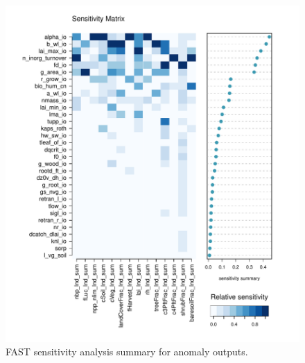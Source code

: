 \documentclass[gmd, manuscript]{copernicus}
\begin{document}
\begin{figure}[t]
\includegraphics[width=12cm]{./graphics/FAST_sensmat_YAnom_level1a_wave01.pdf}
\caption{FAST sensitivity analysis summary for anomaly outputs.}
\label{fig:FAST_sensmat_YAnom_level1a}
\end{figure}



\noappendix       %




\appendixfigures  %
\end{document}
